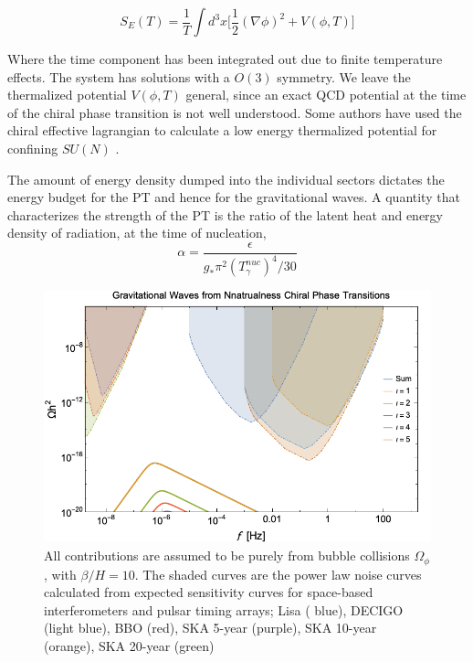 \documentclass[nofootinbib,twocolumn,preprintnumbers]{revtex4-1}
\begin{document}
\begin{equation}
S_{E}(T) = \frac{1}{T}\int d^3x \bigg[\frac{1}{2}(\nabla\phi)^2 + V(\phi,T)  \bigg]
\end{equation}

Where the time component has been integrated out due to finite temperature effects. The system has solutions with a $O(3)$ symmetry. We leave the thermalized potential $V(\phi, T)$ general, since an exact QCD potential at the time of the chiral phase transition is not well understood. Some authors have used the chiral effective lagrangian to calculate a low energy thermalized potential for confining $SU(N)$ .

The amount of energy density dumped into the individual sectors dictates the energy budget for the PT and hence for the gravitational waves.  A quantity that characterizes the strength of the PT is the ratio of the latent heat and energy density of radiation, at the time of nucleation, 
\begin{equation}
\alpha = \frac{\epsilon}{g_{*} \pi^2 (T^{nuc}_{\gamma})^4/30}
\end{equation}

\begin{figure}[tb]
\centering
\includegraphics[scale=.3]{Nnatral.png} 
\caption{ All contributions are assumed to be purely from bubble collisions $\Omega_{\phi}$, with $\beta/H  = 10$.  The shaded curves are the power law noise curves calculated from expected sensitivity curves for space-based interferometers and pulsar timing arrays; Lisa ( blue), DECIGO (light blue), BBO (red), SKA 5-year (purple), SKA 10-year (orange), SKA 20-year (green)   }
\end{figure}
\end{document}
